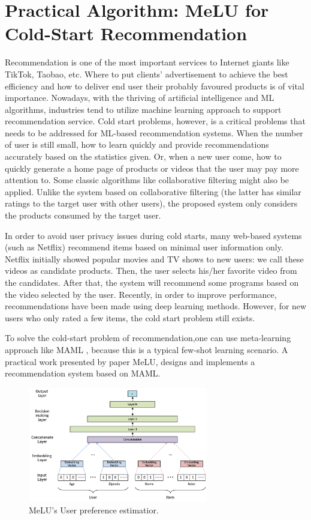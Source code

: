 \section{Practical Algorithm: MeLU for Cold-Start Recommendation}

Recommendation is one of the most important services to Internet giants like TikTok, Taobao, etc. Where to put clients' advertisement to achieve the best efficiency and how to deliver end user their probably favoured products is of vital importance. Nowadays, with the thriving of artificial intelligence and ML algorithms, industries tend to utilize machine learning approach to support recommendation service. Cold start problems, however, is a critical problems that needs to be addressed for ML-based recommendation systems. When the number of user is still small, how to learn quickly and  provide recommendations accurately based on the statistics given. Or, when a new user come, how to quickly generate a home page of products or videos that the user may pay more attention to. Some classic algorithms like collaborative filtering might also be applied. Unlike the system based on collaborative filtering (the latter has similar ratings to the target user with other users), the proposed system only considers the products consumed by the target user.

In order to avoid user privacy issues during cold starts, many web-based systems (such as Netflix) recommend items based on minimal user information only. Netflix initially showed popular movies and TV shows to new users: we call these videos as candidate products. Then, the user selects his/her favorite video from the candidates. After that, the system will recommend some programs based on the video selected by the user. Recently, in order to improve performance, recommendations have been made using deep learning methods. However, for new users who only rated a few items, the cold start problem still exists.

To solve the cold-start problem of recommendation,one can use meta-learning approach like MAML , because this is a typical few-shot learning scenario. A practical work presented by paper MeLU\cite{lee2019melu}, designs and implements a recommendation system based on MAML. 

\begin{figure}[H] 
    \centering 
    \includegraphics[width=0.7\textwidth]{image/MeLU-arch.png} 
    \caption{MeLU's User preference estimatior.}
    \label{fig:melu-estimator} 
\end{figure}

